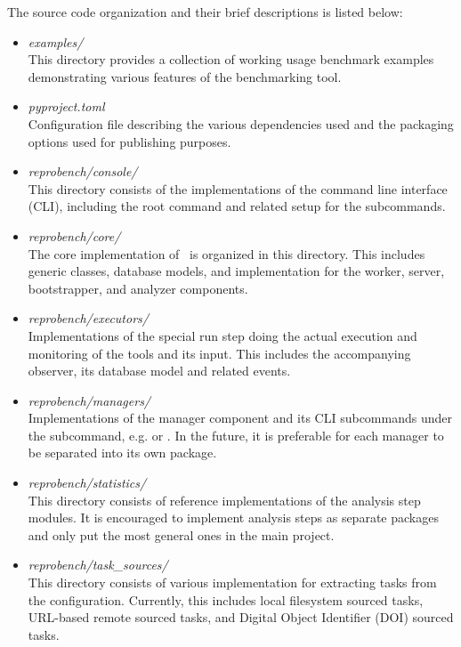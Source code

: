 The source code organization and their brief descriptions is listed below:
\begin{itemize}
    \item \emph{examples/}\\
    This directory provides a collection of working usage benchmark examples demonstrating various features of the benchmarking tool.

    \item \emph{pyproject.toml}\\
    Configuration file describing the various dependencies used and the packaging options used for publishing purposes.

    \item \emph{reprobench/console/}\\
    This directory consists of the implementations of the command line interface (CLI), including the  root command and related setup for the subcommands.

    \item \emph{reprobench/core/}\\
    The core implementation of \OurBenchmarkingTool~is organized in this directory.
    This includes generic classes, database models, and implementation for the worker, server, bootstrapper, and analyzer components.

    \item \emph{reprobench/executors/}\\
    Implementations of the special run step doing the actual execution and monitoring of the tools and its input.
    This includes the accompanying observer, its database model and related events.

    \item \emph{reprobench/managers/}\\
    Implementations of the manager component and its CLI subcommands under the  subcommand, e.g.  or .
    In the future, it is preferable for each manager to be separated into its own package.

    \item \emph{reprobench/statistics/}\\
    This directory consists of reference implementations of the analysis step modules.
    It is encouraged to implement analysis steps as separate packages and only put the most general ones in the main project.

    \item \emph{reprobench/task\_sources/}\\
    This directory consists of various implementation for extracting tasks from the configuration.
    Currently, this includes local filesystem sourced tasks, URL-based remote sourced tasks, and Digital Object Identifier (DOI) sourced tasks.


\end{itemize}
